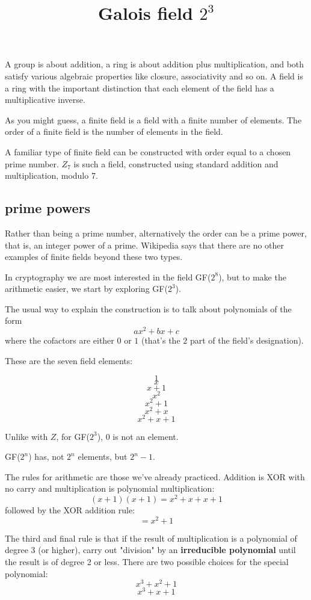 \documentclass[11pt, oneside]{article}
\title{Galois field $2^3$}
\date{}
\begin{document}
\maketitle
\Large

A group is about addition, a ring is about addition plus multiplication, and both satisfy various algebraic properties like closure, associativity and so on.  A field is a ring with the important distinction that each element of the field has a multiplicative inverse.

As you might guess, a finite field is a field with a finite number of elements.  The order of a finite field is the number of elements in the field.  

A familiar type of finite field can be constructed with order equal to a chosen prime number.  $Z_7$ is such a field, constructed using standard addition and multiplication, modulo 7.  

\subsection*{prime powers}
Rather than being a prime number, alternatively the order can be a prime power, that is, an integer power of a prime.  Wikipedia says that there are no other examples of finite fields beyond these two types.

In cryptography we are most interested in the field GF($2^8$), but to make the arithmetic easier, we start by exploring GF($2^3$).

The usual way to explain the construction is to talk about polynomials of the form
\[ ax^2 + bx + c \]
where the cofactors are either $0$ or $1$ (that's the $2$ part of the field's designation).  

These are the seven field elements:

\[ 1 \]
\[ x \]
\[ x + 1 \]
\[ x^2 \]
\[ x^2 + 1 \]
\[ x^2 + x \]
\[ x^2 + x + 1 \]

Unlike with $Z$, for GF($2^3$), $0$ is not an element.

GF($2^n$) has, not $2^n$ elements, but $2^{n}-1$.

The rules for arithmetic are those we've already practiced.  Addition is XOR with no carry and multiplication is polynomial multiplication:
\[ (x + 1)(x + 1) = x^2 + x + x + 1 \]
followed by the XOR addition rule:
\[ = x^2 + 1 \]

The third and final rule is that if the result of multiplication is a polynomial of degree 3 (or higher), carry out "division" by an \textbf{irreducible polynomial} until the result is of degree 2 or less.  There are two possible choices for the special polynomial:
\[ x^3 + x^2 + 1 \]
\[ x^3 + x + 1 \]
\end{document}
